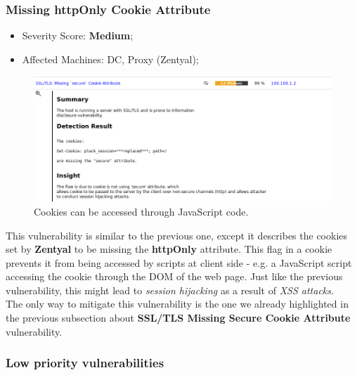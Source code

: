 \subsubsection{Missing httpOnly Cookie Attribute}
\begin{itemize}
\item Severity Score: \textbf{Medium};
\item Affected Machines: DC, Proxy (Zentyal);
\end{itemize}
\begin{figure}[!htb]
\centering
\begin{minipage}{.5\textwidth}
  \centering
  \includegraphics[width=1\textwidth]{secureCookiesDCVuln.png}
  \caption[a]{Cookies can be accessed through JavaScript code.}\label{fig:13}
\end{minipage}%
\end{figure}

This vulnerability is similar to the previous one, except it describes the cookies set by \textbf{Zentyal} to be missing the \textbf{httpOnly} attribute. This flag in a cookie prevents it from being accessed by scripts at client side - e.g. a JavaScript script accessing the cookie through the DOM of the web page. Just like the previous vulnerability, this might lead to \textit{session hijacking} as a result of \textit{XSS attacks}.\\
The only way to mitigate this vulnerability is the one we already highlighted in the previous subsection about \textbf{SSL/TLS Missing Secure Cookie Attribute} vulnerability.

\subsubsection{Low priority vulnerabilities}

